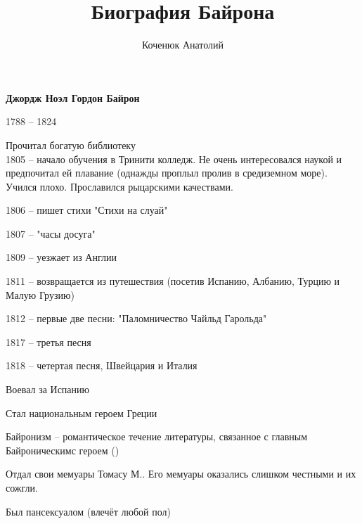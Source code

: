 \documentclass[10pt,a4paper]{article}
\author{Коченюк Анатолий}
\title{Биография Байрона}
\begin{document}
\maketitle
\begin{center}
\textbf{Джордж Ноэл Гордон Байрон}
\end{center}

1788 -- 1824

Прочитал богатую библиотеку\\

1805 -- начало обучения в Тринити колледж. Не очень интересовался наукой и предпочитал ей плавание (однажды проплыл пролив в средиземном море). Учился плохо. Прославился рыцарскими качествами. 

1806 -- пишет стихи "Стихи на слуай"

1807 -- "часы досуга"

1809 -- уезжает из Англии

1811 -- возвращается из путешествия (посетив Испанию, Албанию, Турцию и Малую Грузию)

1812 -- первые две песни: "Паломничество Чайльд Гарольда"

1817 -- третья песня

1818 -- четертая песня, Швейцария и Италия

Воевал за Испанию

Стал национальным героем Греции

Байронизм -- романтическое течение литературы, связанное с главным Байроническимс героем ()

Отдал свои мемуары Томасу М.. Его мемуары оказались слишком честными и их сожгли.

Был пансексуалом (влечёт любой пол)
\end{document}

